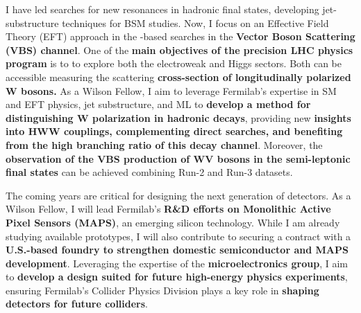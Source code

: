 {\begin{flushleft}
I have led searches for new resonances in hadronic final states, developing jet-substructure techniques for BSM studies. Now, I focus on an Effective Field Theory (EFT) approach in the -based searches in the {\bf Vector Boson Scattering (VBS) channel}. One of the {\bf main objectives of the precision LHC physics program} is to to explore both the electroweak and Higgs sectors. Both can be accessible measuring the scattering {\bf cross-section of longitudinally polarized W bosons.} As a Wilson Fellow, I aim to leverage Fermilab’s expertise in SM and EFT physics, jet substructure, and ML to {\bf develop a method for distinguishing W polarization in hadronic decays}, providing new {\bf insights into HWW couplings, complementing direct searches, and benefiting from the high branching ratio of this decay channel}. Moreover, the {\bf observation of the VBS production of WV bosons in the semi-leptonic final states} can be achieved combining Run-2 and Run-3 datasets.

The coming years are critical for designing the next generation of detectors. As a Wilson Fellow, I will lead Fermilab’s {\bf R\&D efforts on Monolithic Active Pixel Sensors (MAPS)}, an emerging silicon technology. While I am already studying available prototypes, I will also contribute to securing a contract with a {\bf U.S.-based foundry to strengthen domestic semiconductor and MAPS development}. Leveraging the expertise of the {\bf microelectronics group}, I aim to {\bf develop a design suited for future high-energy physics experiments}, ensuring Fermilab’s Collider Physics Division plays a key role in {\bf shaping detectors for future colliders}.



\end{flushleft}}
